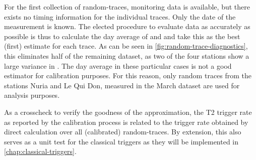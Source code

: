 For the first collection of random-traces, monitoring data is available, but there exists no timing information for the individual traces. Only the date of the 
measurement is known. The elected procedure to evaluate data as accurately as possible is thus to calculate the day average of \Ipeak and \Qpeak and take this as 
the best (first) estimate for each trace. As can be seen in \autoref{fig:random-trace-diagnostics}, this eliminates half of the remaining dataset, as two of the four 
stations show a large variance in \Ipeak. The day average in these particular cases is not a good estimator for calibration purposes. For this reason, only random 
traces from the stations Nuria and Le Qui Don, measured in the March dataset are used for analysis purposes.

As a crosscheck to verify the goodness of the approximation, the T2 trigger rate as reported by the calibration process is related to the trigger rate obtained by
direct calculation over all (calibrated) random-traces. By extension, this also serves as a unit test for the classical triggers as they will be implemented in 
\autoref{chap:classical-triggers}. 


